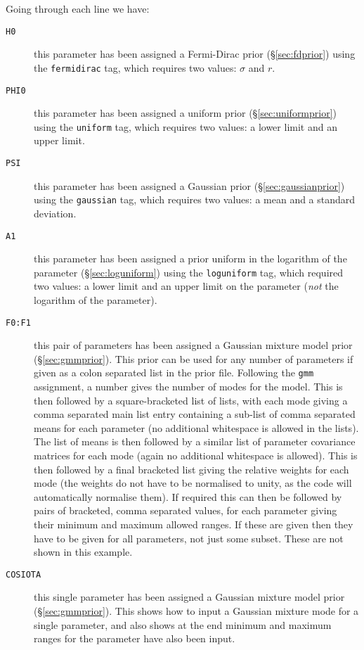 Going through each line we have:
\begin{description}
 \item[{\tt{H0}}] this parameter has been assigned a Fermi-Dirac prior (\S\ref{sec:fdprior}) using the {\tt fermidirac} tag, which requires two values: $\sigma$ and $r$.
 \item[{\tt{PHI0}}] this parameter has been assigned a uniform prior (\S\ref{sec:uniformprior}) using the {\tt uniform} tag, which requires two values: a lower limit and an upper limit.
 \item[{\tt{PSI}}] this parameter has been assigned a Gaussian prior (\S\ref{sec:gaussianprior}) using the {\tt gaussian} tag, which requires two values: a mean and a standard deviation.
 \item[{\tt{A1}}] this parameter has been assigned a prior uniform in the logarithm of the parameter (\S\ref{sec:loguniform}) using the {\tt loguniform} tag, which
 required two values: a lower limit and an upper limit on the parameter ({\it not} the logarithm of the parameter).
 \item[{\tt{F0:F1}}] this pair of parameters has been assigned a Gaussian mixture model prior (\S\ref{sec:gmmprior}). This prior can be used for any number of
 parameters if given as a colon separated list in the prior file. Following the {\tt gmm} assignment, a number gives the number of modes for the model. This is then
 followed by a square-bracketed list of lists, with each mode giving a comma separated main list entry containing a sub-list of comma separated means for each parameter 
 (no additional whitespace is allowed in the lists). The list of means is then followed by a similar list of parameter covariance matrices for each mode (again no
 additional whitespace is allowed). This is then followed by a final bracketed list giving the relative weights for each mode (the weights do not have to be
 normalised to unity, as the code will automatically normalise them). If required this can then be followed by pairs of bracketed, comma separated values, for each
 parameter giving their minimum and maximum allowed ranges. If these are given then they have to be given for all parameters, not just some subset. These are not
 shown in this example.
 \item[{\tt{COSIOTA}}] this single parameter has been assigned a Gaussian mixture model prior (\S\ref{sec:gmmprior}). This shows how to input a Gaussian mixture
 mode for a single parameter, and also shows at the end minimum and maximum ranges for the parameter have also been input.
\end{description}

